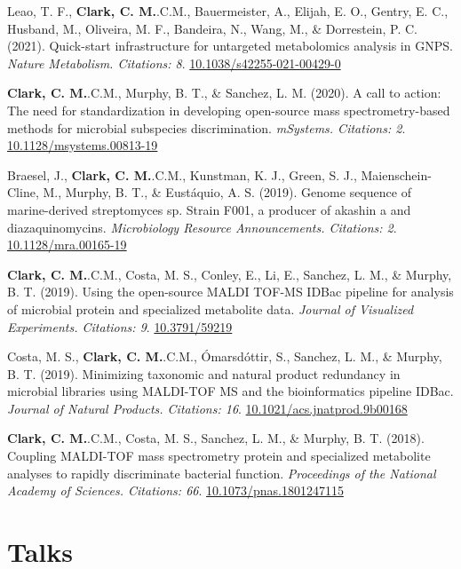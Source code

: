 \documentclass[11pt,a4paper,]{awesome-cv}
\begin{document}
\leavevmode{}%
Leao, T. F., \textbf{Clark, C. M.}.C.M., Bauermeister, A., Elijah, E.
O., Gentry, E. C., Husband, M., Oliveira, M. F., Bandeira, N., Wang, M.,
\& Dorrestein, P. C. (2021). Quick-start infrastructure for untargeted
metabolomics analysis in GNPS. \emph{Nature Metabolism. Citations: 8}.
\href{https://10.1038/s42255-021-00429-0}{10.1038/s42255-021-00429-0}

\leavevmode{}%
\textbf{Clark, C. M.}.C.M., Murphy, B. T., \& Sanchez, L. M. (2020). A
call to action: The need for standardization in developing open-source
mass spectrometry-based methods for microbial subspecies discrimination.
\emph{mSystems. Citations: 2}.
\href{https://10.1128/msystems.00813-19}{10.1128/msystems.00813-19}

\leavevmode{}%
Braesel, J., \textbf{Clark, C. M.}.C.M., Kunstman, K. J., Green, S. J.,
Maienschein-Cline, M., Murphy, B. T., \& Eustáquio, A. S. (2019). Genome
sequence of marine-derived streptomyces sp. Strain F001, a producer of
akashin a and diazaquinomycins. \emph{Microbiology Resource
Announcements. Citations: 2}.
\href{https://10.1128/mra.00165-19}{10.1128/mra.00165-19}

\leavevmode{}%
\textbf{Clark, C. M.}.C.M., Costa, M. S., Conley, E., Li, E., Sanchez,
L. M., \& Murphy, B. T. (2019). Using the open-source MALDI TOF-MS IDBac
pipeline for analysis of microbial protein and specialized metabolite
data. \emph{Journal of Visualized Experiments. Citations: 9}.
\href{https://10.3791/59219}{10.3791/59219}

\leavevmode{}%
Costa, M. S., \textbf{Clark, C. M.}.C.M., Ómarsdóttir, S., Sanchez, L.
M., \& Murphy, B. T. (2019). Minimizing taxonomic and natural product
redundancy in microbial libraries using MALDI-TOF MS and the
bioinformatics pipeline IDBac. \emph{Journal of Natural Products.
Citations: 16}.
\href{https://10.1021/acs.jnatprod.9b00168}{10.1021/acs.jnatprod.9b00168}

\leavevmode{}%
\textbf{Clark, C. M.}.C.M., Costa, M. S., Sanchez, L. M., \& Murphy, B.
T. (2018). Coupling MALDI-TOF mass spectrometry protein and specialized
metabolite analyses to rapidly discriminate bacterial function.
\emph{Proceedings of the National Academy of Sciences. Citations: 66}.
\href{https://10.1073/pnas.1801247115}{10.1073/pnas.1801247115}

\hypertarget{talks}{%
\section{Talks}\label{talks}}
\end{document}
